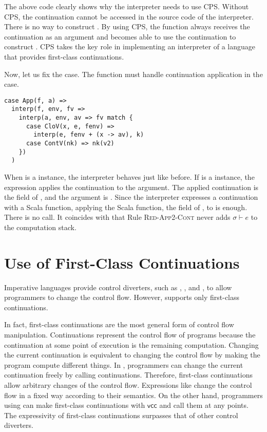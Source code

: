 The above code clearly shows why the interpreter needs to use CPS. Without CPS,
the continuation cannot be accessed in the source code of the interpreter. There
is no way to construct . By using CPS, the  function
always receives the continuation as an argument and becomes able to use the continuation to
construct . CPS takes the key role in implementing an interpreter of
a language that provides first-class continuations.

Now, let us fix the  case.
The  function must handle continuation application in the
 case.

\begin{verbatim}
case App(f, a) =>
  interp(f, env, fv =>
    interp(a, env, av => fv match {
      case CloV(x, e, fenv) =>
        interp(e, fenv + (x -> av), k)
      case ContV(nk) => nk(v2)
    })
  )
\end{verbatim}

When  is a  instance, the interpreter behaves just like before.
If  is a  instance, the expression applies the continuation
to the argument. The applied continuation is the field of , and the argument
is . Since the interpreter expresses a continuation with a Scala function,
applying the Scala function, the field of , to  is enough.
There is no  call. It coincides with that Rule \textsc{Red-App2-Cont}
never adds $\sigma\vdash e$ to the computation stack.

\section{Use of First-Class Continuations}

Imperative languages provide control diverters, such as ,
, and , to allow programmers to change the control
flow. However, \lang supports only first-class continuations.

In fact, first-class continuations are the most general form of control flow
manipulation. Continuations represent the control flow of programs because the
continuation at some point of execution is the remaining computation.
Changing the current continuation is equivalent to changing the control flow by
making the program compute different things.
In \lang, programmers can change the current
continuation freely by calling continuations. Therefore, first-class
continuations allow arbitrary changes of the control flow.
Expressions like  change the control flow in a fixed way according
to their semantics. On the other hand, programmers using \lang can make first-class
continuations with $\textsf{vcc}$ and call them at any points. The expressivity of
first-class continuations surpasses that of other control diverters.

